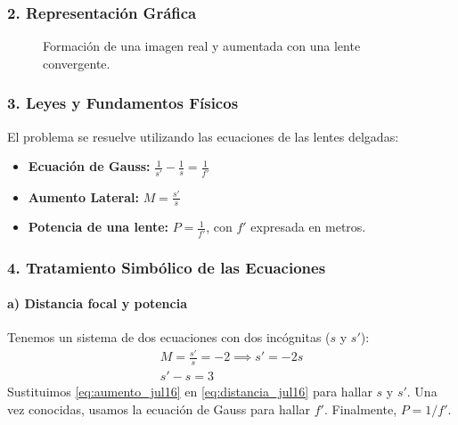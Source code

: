 \subsubsection*{2. Representación Gráfica}
\begin{figure}[H]
    \centering
    \caption{Formación de una imagen real y aumentada con una lente convergente.}
\end{figure}

\subsubsection*{3. Leyes y Fundamentos Físicos}
El problema se resuelve utilizando las ecuaciones de las lentes delgadas:
\begin{itemize}
    \item \textbf{Ecuación de Gauss:} $\frac{1}{s'} - \frac{1}{s} = \frac{1}{f'}$
    \item \textbf{Aumento Lateral:} $M = \frac{s'}{s}$
    \item \textbf{Potencia de una lente:} $P = \frac{1}{f'}$, con $f'$ expresada en metros.
\end{itemize}

\subsubsection*{4. Tratamiento Simbólico de las Ecuaciones}
\paragraph*{a) Distancia focal y potencia}
Tenemos un sistema de dos ecuaciones con dos incógnitas ($s$ y $s'$):
\begin{gather}
    M = \frac{s'}{s} = -2 \implies s' = -2s \label{eq:aumento_jul16} \\
    s' - s = 3 \label{eq:distancia_jul16}
\end{gather}
Sustituimos \eqref{eq:aumento_jul16} en \eqref{eq:distancia_jul16} para hallar $s$ y $s'$. Una vez conocidas, usamos la ecuación de Gauss para hallar $f'$. Finalmente, $P = 1/f'$.

